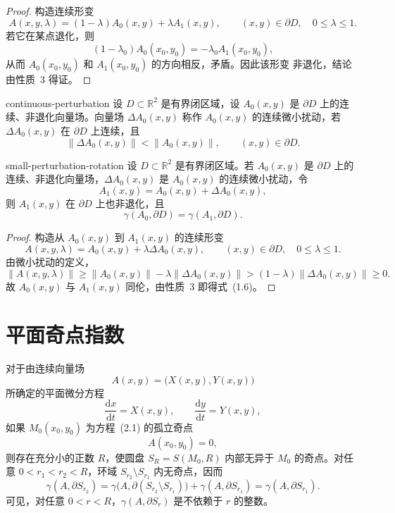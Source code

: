 \begin{proof}
构造连续形变
\[
  A(x,y,\lambda)=(1-\lambda)A_0(x,y)+\lambda A_1(x,y),
  \qquad (x,y)\in\partial D,\quad 0\leq\lambda\leq1.
\]
若它在某点退化，则
\[
  (1-\lambda_0)A_0(x_0,y_0)=-\lambda_0A_1(x_0,y_0),
\]
从而 $A_0(x_0,y_0)$ 和 $A_1(x_0,y_0)$ 的方向相反，矛盾。因此该形变
非退化，结论由性质~3 得证。
\end{proof}

\begin{definition}{}{continuous-perturbation}
设 $D\subset\mathbb{R}^2$ 是有界闭区域，设 $A_0(x,y)$ 是
$\partial D$ 上的连续、非退化向量场。向量场
$\Delta A_0(x,y)$ 称作 $A_0(x,y)$ 的连续微小扰动，若
$\Delta A_0(x,y)$ 在 $\partial D$ 上连续，且
\[
  \lVert\Delta A_0(x,y)\rVert<\lVert A_0(x,y)\rVert,
  \qquad (x,y)\in\partial D.
\]
\end{definition}

\begin{theorem}{}{small-perturbation-rotation}
设 $D\subset\mathbb{R}^2$ 是有界闭区域。若 $A_0(x,y)$ 是
$\partial D$ 上的连续、非退化向量场，$\Delta A_0(x,y)$ 是
$A_0(x,y)$ 的连续微小扰动，令
\[
  A_1(x,y)=A_0(x,y)+\Delta A_0(x,y),
\]
则 $A_1(x,y)$ 在 $\partial D$ 上也非退化，且
\[
  \gamma(A_0,\partial D)=\gamma(A_1,\partial D). \tag{1.6}
\]
\end{theorem}

\begin{proof}
构造从 $A_0(x,y)$ 到 $A_1(x,y)$ 的连续形变
\[
  A(x,y,\lambda)=A_0(x,y)+\lambda\Delta A_0(x,y),
  \qquad (x,y)\in\partial D,\quad0\leq\lambda\leq1.
\]
由微小扰动的定义，
\[
  \lVert A(x,y,\lambda)\rVert
  \geq\lVert A_0(x,y)\rVert-\lambda\lVert\Delta A_0(x,y)\rVert
  >(1-\lambda)\lVert\Delta A_0(x,y)\rVert\geq0.
\]
故 $A_0(x,y)$ 与 $A_1(x,y)$ 同伦，由性质~3 即得式~(1.6)。
\end{proof}

\section{平面奇点指数}

对于由连续向量场
\[
  A(x,y)=\bigl(X(x,y),Y(x,y)\bigr)
\]
所确定的平面微分方程
\[
  \dfrac{\mathrm{d}x}{\mathrm{d}t}=X(x,y),\qquad
  \dfrac{\mathrm{d}y}{\mathrm{d}t}=Y(x,y), \tag{2.1}
\]
如果 $M_0(x_0,y_0)$ 为方程~(2.1) 的孤立奇点
\[
  A(x_0,y_0)=0,
\]
则存在充分小的正数 $R$，使圆盘 $S_R=S(M_0,R)$ 内部无异于
$M_0$ 的奇点。对任意 $0<r_1<r_2<R$，环域
$S_{r_2}\setminus S_{r_1}$ 内无奇点，因而
\[
  \gamma(A,\partial S_{r_2})
  =\gamma\bigl(A,\partial(S_{r_2}\setminus S_{r_1})\bigr)
  +\gamma(A,\partial S_{r_1})
  =\gamma(A,\partial S_{r_1}).
\]
可见，对任意 $0<r<R$，$\gamma(A,\partial S_r)$ 是不依赖于
$r$ 的整数。

